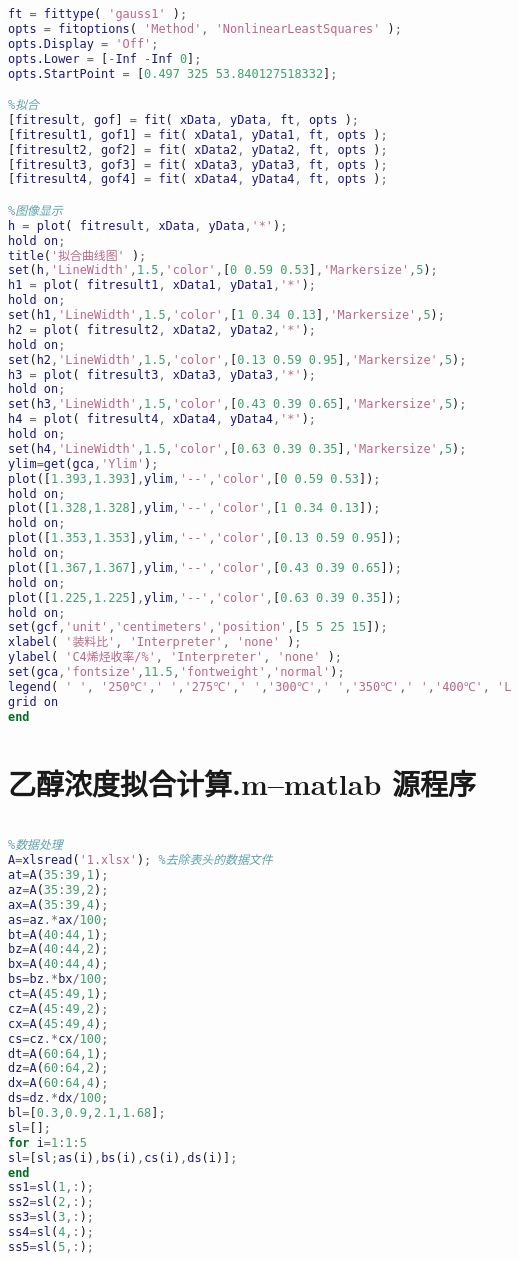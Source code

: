 \documentclass[withoutpreface,bwprint]{cumcmthesis} %
\begin{document}
\begin{appendices}
\begin{lstlisting}[language=matlab]
%拟合函数参数设定
ft = fittype( 'gauss1' );
opts = fitoptions( 'Method', 'NonlinearLeastSquares' );
opts.Display = 'Off';
opts.Lower = [-Inf -Inf 0];
opts.StartPoint = [0.497 325 53.840127518332];

%拟合
[fitresult, gof] = fit( xData, yData, ft, opts );
[fitresult1, gof1] = fit( xData1, yData1, ft, opts );
[fitresult2, gof2] = fit( xData2, yData2, ft, opts );
[fitresult3, gof3] = fit( xData3, yData3, ft, opts );
[fitresult4, gof4] = fit( xData4, yData4, ft, opts );

%图像显示
h = plot( fitresult, xData, yData,'*');
hold on;
title('拟合曲线图' );
set(h,'LineWidth',1.5,'color',[0 0.59 0.53],'Markersize',5);
h1 = plot( fitresult1, xData1, yData1,'*');
hold on;
set(h1,'LineWidth',1.5,'color',[1 0.34 0.13],'Markersize',5);
h2 = plot( fitresult2, xData2, yData2,'*');
hold on;
set(h2,'LineWidth',1.5,'color',[0.13 0.59 0.95],'Markersize',5);
h3 = plot( fitresult3, xData3, yData3,'*');
hold on;
set(h3,'LineWidth',1.5,'color',[0.43 0.39 0.65],'Markersize',5);
h4 = plot( fitresult4, xData4, yData4,'*');
hold on;
set(h4,'LineWidth',1.5,'color',[0.63 0.39 0.35],'Markersize',5);
ylim=get(gca,'Ylim');
plot([1.393,1.393],ylim,'--','color',[0 0.59 0.53]); 
hold on;
plot([1.328,1.328],ylim,'--','color',[1 0.34 0.13]); 
hold on;
plot([1.353,1.353],ylim,'--','color',[0.13 0.59 0.95]); 
hold on;
plot([1.367,1.367],ylim,'--','color',[0.43 0.39 0.65]); 
hold on;
plot([1.225,1.225],ylim,'--','color',[0.63 0.39 0.35]); 
hold on;
set(gcf,'unit','centimeters','position',[5 5 25 15]);
xlabel( '装料比', 'Interpreter', 'none' );
ylabel( 'C4烯烃收率/%', 'Interpreter', 'none' );
set(gca,'fontsize',11.5,'fontweight','normal');
legend( ' ', '250℃',' ','275℃',' ','300℃',' ','350℃',' ','400℃', 'Location', 'NorthWest', 'Interpreter', 'none' );
grid on
end	
\end{lstlisting}


\section{乙醇浓度拟合计算.m--matlab 源程序}
\begin{lstlisting}[language=matlab]
%浓度拟合

%数据处理
A=xlsread('1.xlsx'); %去除表头的数据文件
at=A(35:39,1);
az=A(35:39,2);
ax=A(35:39,4);
as=az.*ax/100;
bt=A(40:44,1);
bz=A(40:44,2);
bx=A(40:44,4);
bs=bz.*bx/100;
ct=A(45:49,1);
cz=A(45:49,2);
cx=A(45:49,4);
cs=cz.*cx/100;
dt=A(60:64,1);
dz=A(60:64,2);
dx=A(60:64,4);
ds=dz.*dx/100;
bl=[0.3,0.9,2.1,1.68];
sl=[];
for i=1:1:5
sl=[sl;as(i),bs(i),cs(i),ds(i)];  
end
ss1=sl(1,:);
ss2=sl(2,:);
ss3=sl(3,:);
ss4=sl(4,:);
ss5=sl(5,:);


\end{lstlisting}
\end{appendices}
\end{document}
